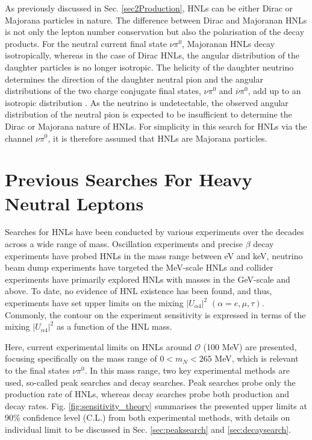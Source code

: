 As previously discussed in Sec. \ref{sec2Production}, HNLs can be either Dirac or Majorana particles in nature.
The difference between Dirac and Majoranan HNLs is not only the lepton number conservation but also the polarisation of the decay products.
For the neutral current final state $\nu\pi^0$, Majoranan HNLs decay isotropically, whereas in the case of Dirac HNLs, the angular distribution of the daughter particles is no longer isotropic.
The helicity of the daughter neutrino determines the direction of the daughter neutral pion and the angular distributions of the two charge conjugate final states, $\nu\pi^{0}$ and $\overline{\nu}\pi^{0}$, add up to an isotropic distribution  \cite{HNLSilvia}.
As the neutrino is undetectable, the observed angular distribution of the neutral pion is expected to be insufficient to determine the Dirac or Majorana nature of HNLs.
For simplicity in this search for HNLs via the channel $\nu\pi^0$, it is therefore assumed that HNLs are Majorana particles.

\section{Previous Searches For Heavy Neutral Leptons}
\label{sec2Previous}


Searches for HNLs have been conducted by various experiments over the decades across a wide range of mass.
Oscillation experiments and precise $\beta$ decay experiments have probed HNLs in the mass range between eV and keV, neutrino beam dump experiments have targeted the MeV-scale HNLs and collider experiments have primarily explored HNLs with masses in the GeV-scale and above.
To date, no evidence of HNL existence has been found, and thus, experiments have set upper limits on the mixing $|U_{\alpha4}|^{2}$ $(\alpha=e,\mu,\tau)$.
Commonly, the contour on the experiment sensitivity is expressed in terms of the mixing $|U_{\alpha4}|^{2}$ as a function of the HNL mass.

Here, current experimental limits on HNLs around $\mathcal{O}$ (100 MeV) are presented, focusing specifically on the mass range of $ 0 < m_{N} < 265 $ MeV, which is relevant to the final states $\nu\pi^{0}$.
In this mass range, two key experimental methods are used, so-called peak searches and decay searches.
Peak searches probe only the production rate of HNLs, whereas decay searches probe both production and decay rates.
Fig. \ref{fig:sensitivity_theory} summarises the presented upper limits at 90\% confidence level (C.L.) from both experimental methods, with details on individual limit to be discussed in Sec. \ref{sec:peaksearch} and \ref{sec:decaysearch}.

